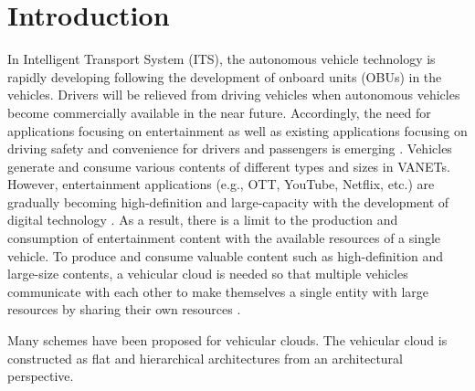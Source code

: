 \documentclass[sensors,article,accept,moreauthors,pdftex]{Definitions/mdpi}
\begin{document}
\section{Introduction}
In Intelligent Transport System (ITS), the autonomous vehicle technology is rapidly developing following the development of onboard units (OBUs) in the vehicles. Drivers will be relieved from driving vehicles when autonomous vehicles become commercially available in the near future. %
 Accordingly, the need for applications focusing on entertainment as well as existing applications focusing on driving safety and convenience for drivers and passengers is emerging \cite{Yuan2018, Qureshi2018, Alahmadi2019, Olariu2020, Aung2023}. Vehicles generate and consume various contents of different types and sizes in VANETs. However, entertainment applications (e.g., OTT, YouTube, Netflix, etc.) are gradually becoming high-definition and large-capacity with the development of digital technology \cite{Pranav2019, Zhang2020}. As a result, there is a limit to the production and consumption of entertainment content with the available resources of a single vehicle. To produce and consume valuable content such as high-definition and large-size contents, a vehicular cloud is needed so that multiple vehicles communicate with each other to make themselves a single entity with large resources by sharing their own resources \cite{Lee2014, Danquah2020, Wang2020, Meneguette2020}.

Many schemes have been proposed for vehicular clouds. The vehicular cloud is constructed as flat and hierarchical architectures from an architectural perspective.
\end{document}

